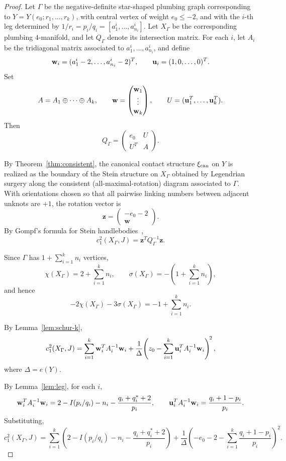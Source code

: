 \documentclass[11pt]{amsart}
\theoremstyle{plain}
\theoremstyle{definition}
\theoremstyle{remark}
\begin{document}
\begin{proof}
Let $\Gamma$ be the negative-definite star-shaped plumbing graph
corresponding to $Y=Y(e_0;r_1,\dots,r_k)$, with central vertex of
weight $e_0\le -2$, and with the $i$-th leg determined by
$1/r_i=p_i/q_i=[a_1^i,\dots,a_{n_i}^i]$. Let $X_\Gamma$ be the
corresponding plumbing $4$-manifold, and let $Q_\Gamma$ denote its
intersection matrix. For each $i$, let $A_i$ be the tridiagonal
matrix associated to $a_1^i,\dots,a_{n_i}^i$, and define
\[
{\bf w}_i=(a_1^i-2,\dots,a_{n_i}^i-2)^T,
\qquad
{\bf u}_i=(1,0,\dots,0)^T.
\]
Set
\[
A=A_1\oplus\cdots\oplus A_k,\qquad
{\bf w}=
\begin{pmatrix}
{\bf w}_1\\
\vdots\\
{\bf w}_k
\end{pmatrix},\qquad
U=({\bf u}_1^T,\dots,{\bf u}_k^T).
\]
Then
\[
Q_\Gamma=
\begin{pmatrix}
e_0 & U\\
U^T & A
\end{pmatrix}.
\]

By Theorem~\ref{thm:consistent}, the canonical contact structure
$\xi_{\rm can}$ on $Y$ is realized as the boundary of the Stein
structure on $X_\Gamma$ obtained by Legendrian surgery along the
consistent (all-maximal-rotation) diagram associated to $\Gamma$.
With orientations chosen so that all pairwise linking numbers between
adjacent unknots are $+1$, the rotation vector is
\[
\mathbf{z}=\begin{pmatrix}-e_0-2\\\mathbf{w}\end{pmatrix}.
\]
By Gompf's formula for Stein
handlebodies~\cite[Proposition~2.3]{Gompf98},
\[
c_1^2(X_\Gamma,J)=\mathbf{z}^TQ_\Gamma^{-1}\mathbf{z}.
\]

Since $\Gamma$ has $1+\sum_{i=1}^k n_i$ vertices,
\[
\chi(X_\Gamma)=2+\sum_{i=1}^k n_i,\qquad
\sigma(X_\Gamma)=-(1+\sum_{i=1}^k n_i),
\]
and hence
\[
-2\chi(X_\Gamma)-3\sigma(X_\Gamma)=-1+\sum_{i=1}^k n_i.
\]

By Lemma~\ref{lem:schur-k},
\[
c_1^2(X_\Gamma,J)
=
\sum_{i=1}^k {\bf w}_i^TA_i^{-1}{\bf w}_i
+
\frac{1}{\Delta}\!\left(z_0-\sum_{i=1}^k {\bf u}_i^TA_i^{-1}{\bf w}_i\right)^{\!2},
\]
where $\Delta=e(Y)$.

By Lemma~\ref{lem:leg}, for each $i$,
\[
{\bf w}_i^TA_i^{-1}{\bf w}_i
=
2-I(p_i/q_i)-n_i-\frac{q_i+q_i^*+2}{p_i},
\qquad
{\bf u}_i^TA_i^{-1}{\bf w}_i=\frac{q_i+1-p_i}{p_i}.
\]
Substituting,
\[
c_1^2(X_\Gamma,J)
=
\sum_{i=1}^k\!\left(2-I(p_i/q_i)-n_i-\frac{q_i+q_i^*+2}{p_i}\right)
+
\frac{1}{\Delta}\!\left(-e_0-2-\sum_{i=1}^k\frac{q_i+1-p_i}{p_i}\right)^{\!2}.
\]


\end{proof}
\end{document}
